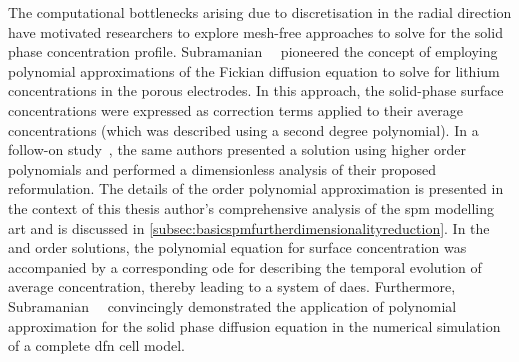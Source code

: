 The   computational   bottlenecks  arising   due   to   discretisation  in   the
radial   direction    have   motivated   researchers   to    explore   mesh-free
approaches   to    solve   for   the   solid    phase   concentration   profile.
Subramanian~\etal~\cite{Subramanian2004}  pioneered  the  concept  of  employing
polynomial approximations of the Fickian diffusion equation to solve for lithium
concentrations  in the  porous  electrodes. In  this  approach, the  solid-phase
surface  concentrations were  expressed  as correction  terms  applied to  their
average concentrations (which  was described using a  second degree polynomial).
In  a  follow-on  study~\cite{Subramanian2005},  the same  authors  presented  a
solution using higher  order polynomials and performed  a dimensionless analysis
of  their proposed  reformulation.  The details  of  the   order
polynomial approximation  is presented  in the context  of this  thesis author's
comprehensive  analysis of  the  \gls{spm}  modelling art  and  is discussed  in
\cref{subsec:basicspmfurtherdimensionalityreduction}.  In  the  
and    order  solutions,  the polynomial  equation  for  surface
concentration  was  accompanied  by  a corresponding  \gls{ode}  for  describing
the  temporal  evolution   of  average  concentration,  thereby   leading  to  a
system  of \glspl{dae}.  Furthermore, Subramanian~\etal{}~\cite{Subramanian2007}
convincingly demonstrated  the application  of polynomial approximation  for the
solid  phase  diffusion equation  in  the  numerical  simulation of  a  complete
\gls{dfn} cell model.


